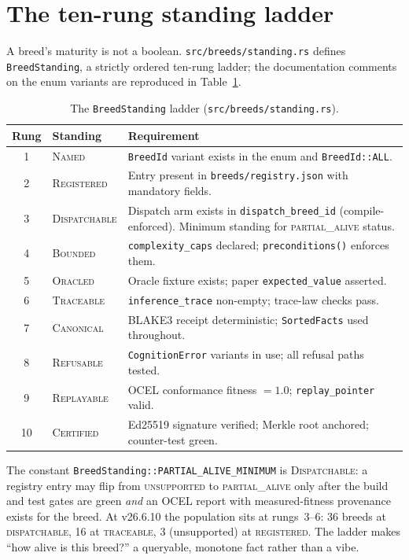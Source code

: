 \documentclass[11pt,oneside]{report}
\newcommand{\projver}{v26.6.10}
\begin{document}
\section{The ten-rung standing ladder}

A breed's maturity is not a boolean. \texttt{src/breeds/standing.rs}
defines \texttt{BreedStanding}, a strictly ordered ten-rung ladder; the
documentation comments on the enum variants are reproduced in
Table~\ref{tab:ladder}.

\begin{table}[ht]
\centering
\caption{The \texttt{BreedStanding} ladder (\texttt{src/breeds/standing.rs}).}
\label{tab:ladder}
\begin{tabular}{clp{8.6cm}}
\toprule
Rung & Standing & Requirement \\
\midrule
1 & \textsc{Named} & \texttt{BreedId} variant exists in the enum and \texttt{BreedId::ALL}. \\
2 & \textsc{Registered} & Entry present in \texttt{breeds/registry.json} with mandatory fields. \\
3 & \textsc{Dispatchable} & Dispatch arm exists in \texttt{dispatch\_breed\_id} (compile-enforced). Minimum standing for \textsc{partial\_alive} status. \\
4 & \textsc{Bounded} & \texttt{complexity\_caps} declared; \texttt{preconditions()} enforces them. \\
5 & \textsc{Oracled} & Oracle fixture exists; paper \texttt{expected\_value} asserted. \\
6 & \textsc{Traceable} & \texttt{inference\_trace} non-empty; trace-law checks pass. \\
7 & \textsc{Canonical} & BLAKE3 receipt deterministic; \texttt{SortedFacts} used throughout. \\
8 & \textsc{Refusable} & \texttt{CognitionError} variants in use; all refusal paths tested. \\
9 & \textsc{Replayable} & OCEL conformance fitness $= 1.0$; \texttt{replay\_pointer} valid. \\
10 & \textsc{Certified} & Ed25519 signature verified; Merkle root anchored; counter-test green. \\
\bottomrule
\end{tabular}
\end{table}

The constant \texttt{BreedStanding::PARTIAL\_ALIVE\_MINIMUM} is
\textsc{Dispatchable}: a registry entry may flip from
\textsc{unsupported} to \textsc{partial\_alive} only after the build and
test gates are green \emph{and} an OCEL report with measured-fitness
provenance exists for the breed. At \projver{} the population sits at
rungs~3--6: 36 breeds at \textsc{dispatchable}, 16 at \textsc{traceable},
3 (unsupported) at \textsc{registered}. The ladder makes ``how alive is
this breed?'' a queryable, monotone fact rather than a vibe.
\end{document}
